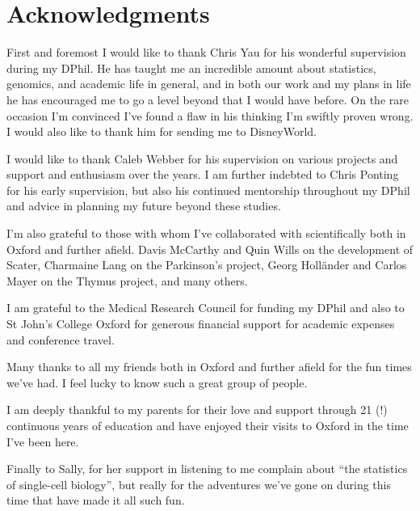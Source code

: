 
%
%

\bigskip

\begingroup
\let\clearpage\relax
\let\cleardoublepage\relax
\let\cleardoublepage\relax
\chapter*{Acknowledgments}

First and foremost I would like to thank Chris Yau for his wonderful supervision during my DPhil. 
He has taught me an incredible amount about statistics, genomics, and academic life in general, and in both our work and my plans in life he has encouraged me to go a level beyond that I would have before. On the rare occasion I'm convinced I've found a flaw in his thinking I'm swiftly proven wrong. I would also like to thank him for sending me to DisneyWorld.

I would like to thank Caleb Webber for his supervision on various projects and support and enthusiasm over the years. I am further indebted to Chris Ponting for his early supervision, but also his continued mentorship throughout my DPhil and advice in planning my future beyond these studies.

I'm also grateful to those with whom I've collaborated with scientifically both in Oxford and further afield. Davis McCarthy and Quin Wills on the development of Scater, Charmaine Lang on the Parkinson's project, Georg Holl{\"a}nder and Carlos Mayer on the Thymus project, and many others.

I am grateful to the Medical Research Council for funding my DPhil and also to St John's College Oxford for generous financial support for academic expenses and conference travel.

Many thanks to all my friends both in Oxford and further afield for the fun times we've had. I feel lucky to know such a great group of people.

I am deeply thankful to my parents for their love and support through 21 (!) continuous years of education and have enjoyed their visits to Oxford in the time I've been here.

Finally to Sally, for her support in listening to me complain about ``the statistics of single-cell biology'',
but really for the adventures we've gone on during this time that have made it all such fun.


\endgroup
